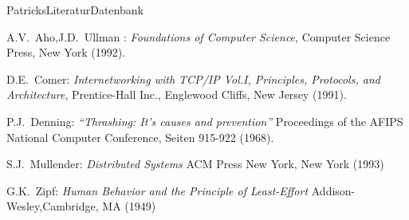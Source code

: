 
\begin{thebibliography}{PatricksLiteraturDatenbank}
\label{Literaturverzeichnis}


A.V.~Aho,J.D.~Ullman : {\em Foundations of Computer Science},
			Computer Science Press, New York (1992).

D.E.~Comer: {\em Internetworking with TCP/IP Vol.I, Principles, Protocols, and Architecture},
			Prentice-Hall Inc., Englewood Cliffs, New Jersey (1991).

P.J.~Denning:	{\em "`Thrashing: It's causes and prevention"'} 
			Proceedings of the AFIPS National Computer Conference, Seiten 915-922 (1968).

S.J.~Mullender:	{\em Distributed Systems} 
			ACM Press New York, New York (1993)
		
G.K.~Zipf:		{\em Human Behavior and the Principle of Least-Effort}
				Addison-Wesley,Cambridge, MA (1949)

\end{thebibliography}
